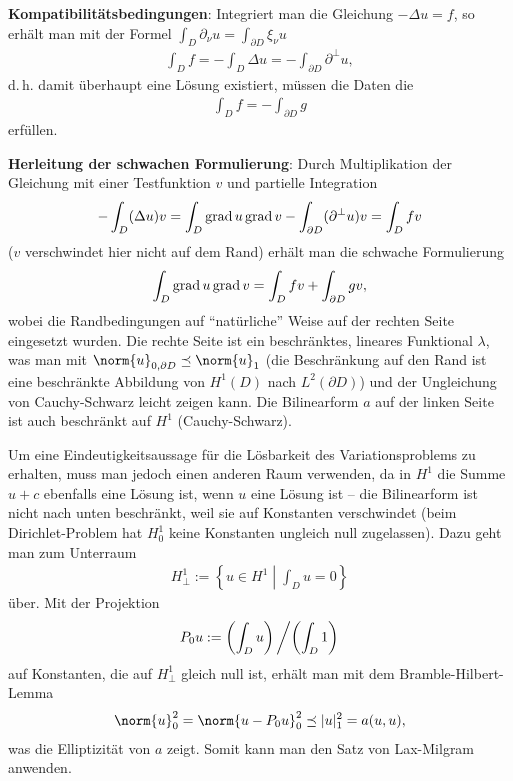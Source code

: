 \textbf{Kompatibilitätsbedingungen}:
Integriert man die Gleichung $-\Delta u = f$, so erhält man mit der Formel
$\int_D \partial_\nu u = \int_{\partial D} \xi_\nu u$
\begin{align*}
    \int_D f
    = -\int_D \Delta u
    = -\int_{\partial D} \partial^\perp u,
\end{align*}
d.\,h. damit überhaupt eine Lösung existiert, müssen die Daten die
\begin{align*}
    \int_D f
    = -\int_{\partial D} g
\end{align*}
erfüllen.

\linie

\textbf{Herleitung der schwachen Formulierung}:
Durch Multiplikation der Gleichung mit einer Testfunktion $v$ und partielle Integration
\begin{align*}
    -\int_D (\Delta u) v
    = \int_D \operatorname{grad} u \operatorname{grad} v
    -\int_{\partial D} (\partial^\perp u) v
    = \int_D fv
\end{align*}
($v$ verschwindet hier nicht auf dem Rand) erhält man die schwache Formulierung
\begin{align*}
    \int_D \operatorname{grad} u \operatorname{grad} v
    = \int_D fv + \int_{\partial D} gv,
\end{align*}
wobei die Randbedingungen auf "`natürliche"' Weise auf der rechten Seite eingesetzt wurden.
Die rechte Seite ist ein beschränktes, lineares Funktional $\lambda$,
was man mit $\norm{u}_{0,\partial D} \preceq \norm{u}_1$
(die Beschränkung auf den Rand ist eine beschränkte Abbildung von $H^1(D)$ nach $L^2(\partial D)$)
und der Ungleichung von Cauchy-Schwarz leicht zeigen kann.
Die Bilinearform $a$ auf der linken Seite ist auch beschränkt auf $H^1$ (Cauchy-Schwarz).

\pagebreak

Um eine Eindeutigkeitsaussage für die Lösbarkeit des Variationsproblems zu erhalten,
muss man jedoch einen anderen Raum verwenden, da in $H^1$ die Summe $u + c$ ebenfalls eine
Lösung ist, wenn $u$ eine Lösung ist --
die Bilinearform ist nicht nach unten beschränkt, weil sie auf Konstanten verschwindet
(beim Dirichlet-Problem hat $H_0^1$ keine Konstanten ungleich null zugelassen).
Dazu geht man zum Unterraum
\begin{align*}
    H_\perp^1 := \left\{u \in H^1 \;\left|\; \int_D u = 0\right.\right\}
\end{align*}
über.
Mit der Projektion
\begin{align*}
    P_0 u := \left(\int_D u\right)\left/\left(\int_D 1\right)\right.
\end{align*}
auf Konstanten, die auf $H_\perp^1$ gleich null ist,
erhält man mit dem Bramble-Hilbert-Lemma
\begin{align*}
    \norm{u}_0^2 = \norm{u - P_0 u}_0^2 \preceq |u|_1^2 = a(u, u),
\end{align*}
was die Elliptizität von $a$ zeigt.
Somit kann man den Satz von Lax-Milgram anwenden.

